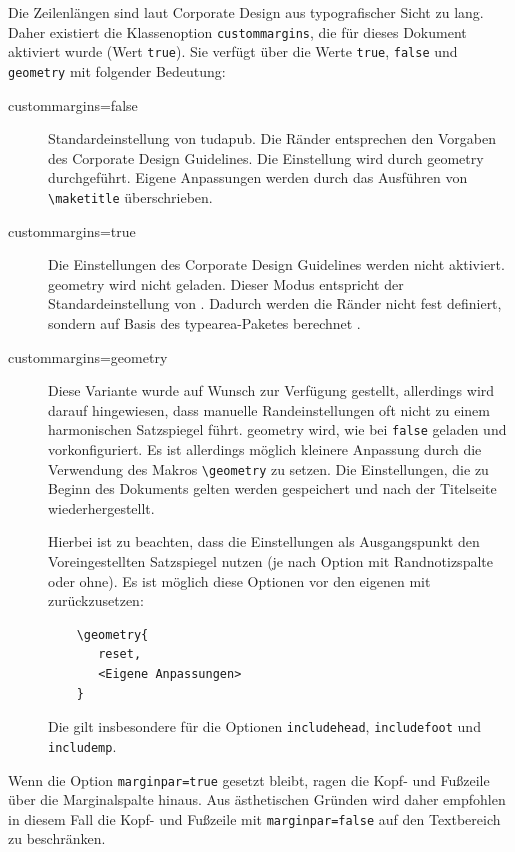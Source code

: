 \documentclass[
	ngerman,
	ruledheaders=section,%
	class=report,%
	thesis={type=bachelor},%
	accentcolor=9c,%
	custommargins=true,%
	marginpar=false,%
	parskip=half-,%
	fontsize=11pt,%
]{tudapub}
\let\code\texttt
\let\pck\textsf
\let\cls\textsf
\begin{document}
Die Zeilenlängen sind laut Corporate Design aus typografischer Sicht zu lang.
Daher existiert die Klassenoption \code{custommargins}, die für dieses Dokument aktiviert wurde (Wert \code{true}). Sie verfügt über die Werte \code{true}, \code{false} und \code{geometry} mit folgender Bedeutung:

\begin{description}
\item[custommargins=false] Standardeinstellung von \cls{tudapub}. Die Ränder entsprechen den Vorgaben des Corporate Design Guidelines. Die Einstellung wird durch \pck{geometry} durchgeführt. Eigene Anpassungen werden durch das Ausführen von \code{\textbackslash{}maketitle} überschrieben.
\item[custommargins=true] Die Einstellungen des Corporate Design Guidelines werden nicht aktiviert. \pck{geometry} wird nicht geladen. Dieser Modus entspricht der Standardeinstellung von \KOMAScript{}. Dadurch werden die Ränder nicht fest definiert, sondern auf Basis des \pck{typearea}-Paketes berechnet \cite[vgl.][]{scrguide}.
\item[custommargins=geometry]  Diese Variante wurde auf Wunsch zur Verfügung gestellt, allerdings wird darauf hingewiesen, dass manuelle Randeinstellungen oft nicht zu einem harmonischen Satzspiegel führt.
\pck{geometry} wird, wie bei \code{false} geladen und vorkonfiguriert. Es ist allerdings möglich kleinere Anpassung durch die Verwendung des Makros \code{\textbackslash{}geometry} zu setzen. Die Einstellungen, die zu Beginn des Dokuments gelten werden gespeichert und nach der Titelseite wiederhergestellt.

Hierbei ist zu beachten, dass die Einstellungen als Ausgangspunkt den Voreingestellten Satzspiegel nutzen (je nach Option mit Randnotizspalte oder ohne). Es ist möglich diese Optionen vor den eigenen mit zurückzusetzen:
\begin{verbatim}
	\geometry{
	   reset,
	   <Eigene Anpassungen>
	}
\end{verbatim}
Die gilt insbesondere für die Optionen \code{includehead}, \code{includefoot} und \code{includemp}.
\end{description}


Wenn die Option \code{marginpar=true} gesetzt bleibt, ragen die Kopf- und Fußzeile über die Marginalspalte hinaus. Aus ästhetischen Gründen wird daher empfohlen in diesem Fall die Kopf- und Fußzeile  mit \code{marginpar=false}  auf den Textbereich zu beschränken.
\end{document}
